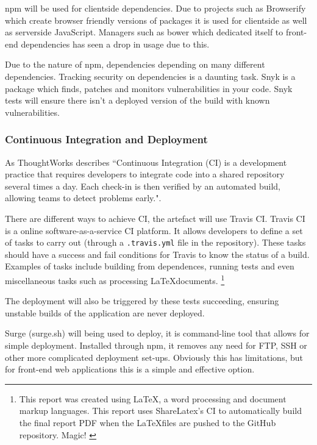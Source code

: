 npm will be used for clientside dependencies. Due to projects such as Browserify which create browser friendly versions of packages it is used for clientside as well as serverside JavaScript. \cite{browserify} Managers such as bower which dedicated itself to front-end dependencies has seen a drop in usage due to this. \cite{bower}

Due to the nature of npm, dependencies depending on many different dependencies. Tracking security on dependencies is a daunting task. Snyk is a package which finds, patches and monitors vulnerabilities in your code. \cite{snyk} Snyk tests will ensure there isn't a deployed version of the build with known vulnerabilities.

\subsubsection{Continuous Integration and Deployment} \label{a-d--continuous-integration}

As ThoughtWorks describes ``Continuous Integration (CI) is a development practice that requires developers to integrate code into a shared repository several times a day. Each check-in is then verified by an automated build, allowing teams to detect problems early.". \cite{continuous_integration}

There are different ways to achieve CI, the artefact will use Travis CI. Travis CI is a online software-as-a-service CI platform. It allows developers to define a set of tasks to carry out (through a \verb|.travis.yml| file in the repository). These tasks should have a success and fail conditions for Travis to know the status of a build. Examples of tasks include building from dependences, running tests and even miscellaneous tasks such as processing \LaTeX documents. \footnote{This report was created using \LaTeX, a word processing and document markup languages. \cite{latex} This report uses ShareLatex's CI to automatically build the final report PDF when the \LaTeX files are pushed to the GitHub repository. Magic! \cite{sharelatex}}

The deployment will also be triggered by these tests succeeding, ensuring unstable builds of the application are never deployed.

Surge (surge.sh) will being used to deploy, it is command-line tool that allows for simple deployment. Installed through npm, it removes any need for FTP, SSH or other more complicated deployment set-ups. Obviously this has limitations, but for front-end web applications this is a simple and effective option. \cite{surge}

